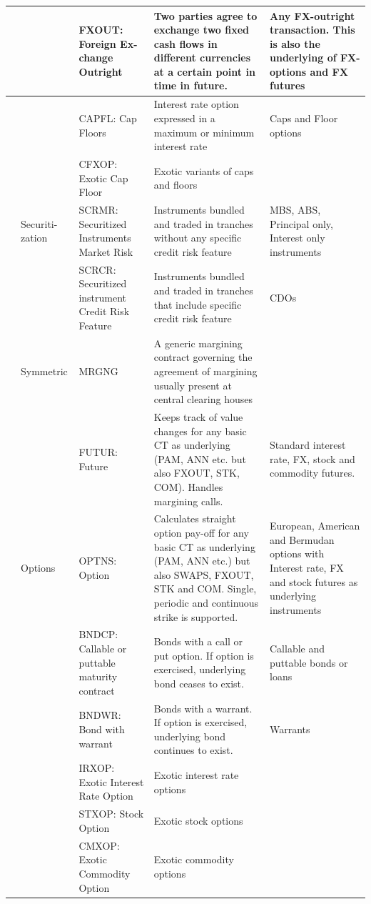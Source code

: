 \documentclass[9pt,oneside]{amsart}
\begin{document}
\begin{longtable}{| p{}p{}p{}p{}p{} |}
	\hline 
	 & & FXOUT: Foreign Ex-change Outright & Two parties agree to exchange two fixed cash flows in different currencies at a certain point in time in future. & Any FX-outright transaction. This is also the underlying of FX-options and FX futures \\
	\hline 
	 & & CAPFL: Cap Floors & Interest rate option expressed in a maximum or minimum interest rate & Caps and Floor options \\
	\hline 
	 & & CFXOP: Exotic Cap Floor & Exotic variants of caps and floors & \\
	\hline 
	 & Securiti-zation & SCRMR: Securitized Instruments Market Risk & Instruments bundled and traded in tranches without any specific credit risk feature & MBS, ABS, Principal only, Interest only instruments \\
	\hline 
	 & & SCRCR: Securitized instrument Credit Risk Feature & Instruments bundled and traded in tranches that include specific credit risk feature & CDOs \\
	\hline 
	 & Symmetric & MRGNG & A generic margining contract governing the agreement of margining usually present at central clearing houses & \\
	\hline 
	 & & FUTUR: Future & Keeps track of value changes for any basic CT as underlying (PAM, ANN etc. but also FXOUT, STK, COM). Handles margining calls. & Standard interest rate, FX, stock and commodity futures. \\
	\hline 
	 & Options & OPTNS: Option & Calculates straight option pay-off for any basic CT as underlying (PAM, ANN etc.) but also SWAPS, FXOUT, STK and COM. Single, periodic and continuous strike is supported. & European, American and Bermudan options with Interest rate, FX and stock futures as underlying instruments \\
	\hline 
	 & & BNDCP: Callable or puttable maturity contract & Bonds with a call or put option. If option is exercised, underlying bond ceases to exist. & Callable and puttable bonds or loans \\
	\hline 
	 & & BNDWR: Bond with warrant & Bonds with a warrant. If option is exercised, underlying bond continues to exist. & Warrants \\
	\hline 
	 & & IRXOP: Exotic Interest Rate Option & Exotic interest rate options & \\
	\hline 
	 & & STXOP: Stock Option & Exotic stock options &  \\
	\hline 
	 & & CMXOP: Exotic Commodity Option & Exotic commodity options & \\

\end{longtable}
\end{document}
